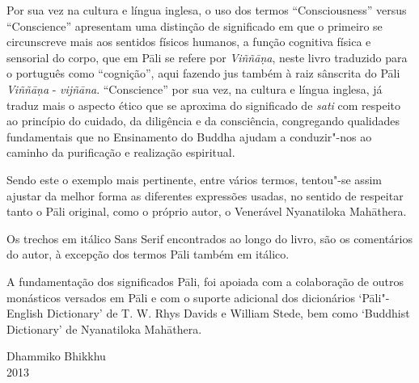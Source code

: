 Por sua vez na cultura e língua inglesa, o uso dos termos “Consciousness” versus “Conscience”
apresentam uma distinção de significado em que o primeiro se circunscreve mais aos sentidos 
físicos humanos, a função cognitiva física e sensorial do corpo, que em Pāli se refere por
\emph{Viññāṇa}, neste livro traduzido para o português como “cognição”, 
aqui fazendo jus também à raiz sânscrita do Pāli \emph{Viññāṇa} - \emph{vijñāna}.
“Conscience” por sua vez, na cultura e língua inglesa, já traduz mais o aspecto
ético que se aproxima do significado de \emph{sati} com respeito ao princípio do
cuidado, da diligência e da consciência, congregando qualidades fundamentais que no 
Ensinamento do Buddha ajudam a conduzir"-nos ao caminho da purificação e realização espiritual.

Sendo este o exemplo mais pertinente, entre vários termos, tentou"-se assim ajustar da melhor
forma as diferentes expressões usadas, no sentido de respeitar tanto o Pāli
original, como o próprio autor, o Venerável Nyanatiloka Mahāthera.

Os trechos em itálico Sans Serif encontrados ao longo do livro, são os comentários
do autor, à excepção dos termos Pāli também em itálico.

A fundamentação dos significados Pāli, foi apoiada com a colaboração de outros
monásticos versados em Pāli e com o suporte adicional dos dicionários
‘Pāli"-English Dictionary’ de T. W. Rhys Davids e William Stede, bem como
‘Buddhist Dictionary’ de Nyanatiloka Mahāthera.

\bigskip

{\raggedleft
  Dhammiko Bhikkhu\\
  2013
\par}

